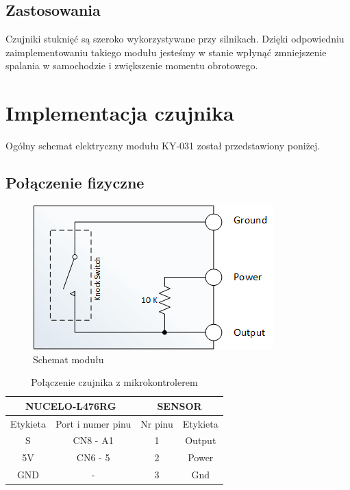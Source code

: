 \documentclass[11pt, a4paper]{article}
\begin{document}
\subsection{Zastosowania}
Czujniki stuknięć są szeroko wykorzystywane przy silnikach. Dzięki odpowiedniu zaimplementowaniu takiego modułu jesteśmy w stanie wpłynąć zmniejszenie spalania w samochodzie i zwiększenie momentu obrotowego.

\newpage

\section{Implementacja czujnika}
Ogólny schemat elektryczny modułu KY-031 został przedstawiony poniżej.

\subsection{Połączenie fizyczne}

\vspace{0.5cm}
\begin{figure}[h!]
    \centering
    \includegraphics[scale=0.75]{fig/KY-031/polaczenie_modulu/polaczenie.png}
    \caption{Schemat modułu}
    \label{fig:my_label}
\end{figure}
\vspace{0.5cm}

\vspace{0.5cm}
\begin{table}[h!]
    \centering
    \begin{tabular}{|c|c|c|c|} 
        \hline
        \multicolumn{2}{|c|}{NUCELO-L476RG} & \multicolumn{2}{c|}{SENSOR}  \\ 
        \hline
        Etykieta & Port i numer pinu       & Nr pinu & Etykieta           \\ 
        \hline
        S        & CN8 - A1                        & 1       & Output                 \\
        5V       & CN6 - 5                   & 2       & Power              \\
        GND      & -                       & 3       & Gnd              \\
        
        \hline
    \end{tabular}
    \caption{Połączenie czujnika z mikrokontrolerem}
\end{table}
\vspace{0.5cm}
\end{document}
